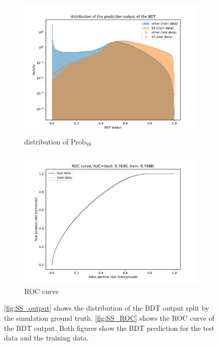 \begin{figure}
    \centering
    \begin{subfigure}{0.5\textwidth}
        \centering
        \includegraphics[width=\textwidth]{images/SS_output.pdf}
        \caption{distribution of $\text{Prob}_\text{SS}$}
        \label{fig:SS_output}
    \end{subfigure}%
    \begin{subfigure}{0.5\textwidth}
        \centering
        \includegraphics[width=\textwidth]{images/SS_ROC.pdf}
        \caption{ROC curve}
        \label{fig:SS_ROC}
    \end{subfigure}%
    \caption{\autoref{fig:SS_output} shows the distribution of the BDT output split by the simulation ground truth. \autoref{fig:SS_ROC} shows the ROC curve of the BDT output. Both figures show the BDT prediction for the test data and the training data.}
    \label{fig:SS_history}
\end{figure}


